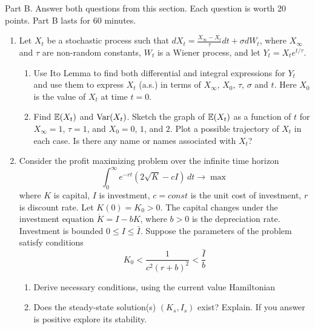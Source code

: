 \documentclass[12pt, a4paper]{article}
\begin{document}
Part B.
Answer both questions from this section. Each question is worth 20 points.
Part B lasts for 60 minutes.
\begin{enumerate}[resume]
\item Let $X_t$ be a stochastic process such that
$dX_t=\frac{X_{\infty}-X_t}{\tau}dt+\sigma dW_t$, where $X_{\infty}$ and $\tau$ are non-random constants, $W_t$ is a Wiener process, and let $Y_t=X_t e^{t/\tau}$.
\begin{enumerate}
\item Use Ito Lemma to find both differential and integral expressions for $Y_t$ and use them to express $X_t$ (a.s.) in terms of $X_{\infty}$, $X_0$, $\tau$, $\sigma$ and $t$. Here $X_0$ is the value of $X_t$ at time $t=0$.
\item Find $\operatorname{\mathbb{E}}(X_t)$ and $\operatorname{Var}(X_t)$. Sketch the graph of $\operatorname{\mathbb{E}}(X_t)$ as a function of $t$ for $X_{\infty}=1$, $\tau=1$, and $X_0 = 0$, $1$, and $2$. Plot a possible trajectory of $X_t$ in each case. Is there any name or names associated with $X_t$?
\end{enumerate}

\item Consider the profit maximizing problem over the infinite time horizon
\[
\int_0^{\infty} e^{-rt}(2\sqrt{K}-cI)\, dt \to \max
\]
where $K$ is capital, $I$ is investment, $c=const$ is the unit cost of investment, $r$ is discount rate. Let $K(0)=K_0>0$. The capital changes under the investment equation $\dot{K}=I-bK$, where $b>0$ is the depreciation rate. Investment is bounded $0\leq I\leq \bar{I}$. Suppose the parameters of the problem satisfy conditions
\[
K_0 < \frac{1}{c^2(r+b)^2} < \frac{\bar{I}}{b}
\]
\begin{enumerate}
\item Derive necessary conditions, using the current value Hamiltonian
\item Does the steady-state solution(s) $(K_s,I_s)$ exist? Explain. If you answer is positive explore its stability.
\end{enumerate}

\end{enumerate}
\end{document}
